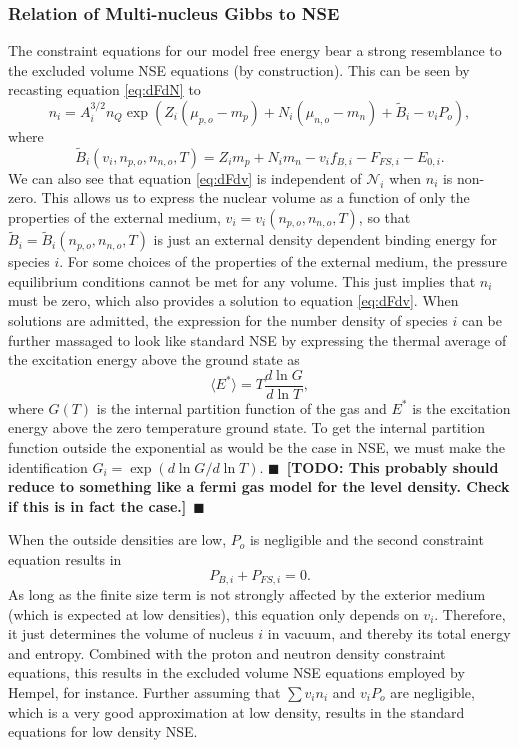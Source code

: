 \documentclass[11pt,letter]{article}
\newcommand{\todo}[1]{{$\blacksquare$~\textbf{\color{blue}[TODO: #1]}}~$\blacksquare$}
\begin{document}
\subsubsection{Relation of Multi-nucleus Gibbs to NSE}
The constraint equations for our model free energy bear a strong resemblance 
to the excluded volume NSE equations (by construction).  This can be seen by recasting 
equation \ref{eq:dFdN} to 
\begin{equation}
n_i = A_i^{3/2} n_Q \exp(Z_i (\mu_{p,o} - m_p) + N_i (\mu_{n,o} - m_n) + \tilde B_i - v_i P_o),
\end{equation}
where 
\begin{equation}
\tilde B_i(v_i, n_{p,o}, n_{n,o}, T) = 
 Z_i m_p + N_i m_n - v_i f_{B,i} - F_{FS,i} - E_{0,i}.
\end{equation}
We can also see that equation \ref{eq:dFdv} is independent of $\mathcal{N}_i$ 
when $n_i$ is non-zero.  This allows us to express the nuclear volume as a 
function of only the properties of the external medium, $v_i = v_i(n_{p,o},
n_{n,o}, T)$, so that $\tilde B_i = \tilde B_i(n_{p,o}, n_{n,o}, T)$ is just 
an external density dependent binding energy for species $i$.  For some choices 
of the properties of the external medium, the pressure equilibrium conditions 
cannot be met for any volume.  This just implies that $n_i$ must be zero, which 
also provides a solution to equation \ref{eq:dFdv}.  When solutions are admitted, 
the expression for the number density of species $i$ can be further massaged to look like standard NSE by expressing the thermal average 
of the excitation energy above the ground state as 
\begin{equation}
\langle E^* \rangle = T \frac{d \ln G}{d \ln T},
\end{equation} 
where $G(T)$ is the internal partition function of the gas and $E^*$ is the 
excitation energy above the zero temperature ground state.  To get the 
internal partition function outside the exponential as would be the case in 
NSE, we must make the identification $ G_i = \exp(d \ln G/ d\ln T)$.  
\todo{This probably should reduce to something like a fermi gas model for the 
level density.  Check if this is in fact the case.}

When the outside densities are low, $P_o$ is negligible and the second
constraint equation results in \begin{equation}
P_{B,i} + P_{FS,i} = 0.
\end{equation} 
As long as the finite size term is not strongly affected by the exterior medium
(which is expected at low densities), this equation only depends on $v_i$.
Therefore, it just determines the volume of nucleus $i$ in vacuum, and thereby
its total energy and entropy.  Combined with the proton and neutron density 
constraint equations, this results in the excluded volume NSE equations employed 
by Hempel, for instance.  Further assuming that $\sum v_i n_i$ and $v_i P_o$ are 
negligible, which is a very good approximation at low density, results in the
standard equations for low density NSE.
\end{document}

